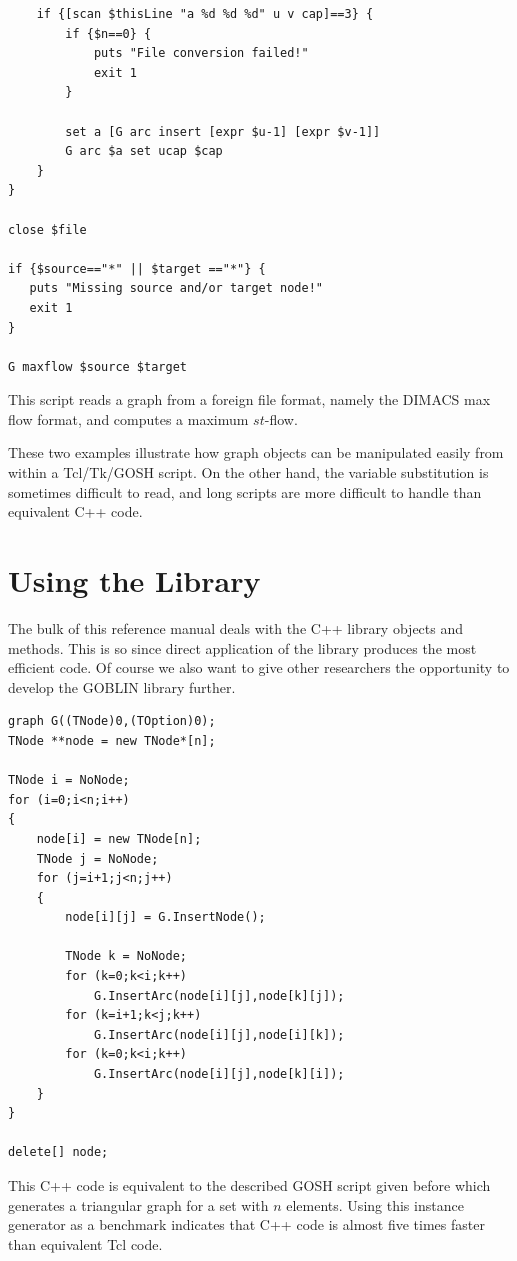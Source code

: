 \documentclass[a4paper,11pt,twoside]{book}
\begin{document}
\begin{multicols}{2}
\begin{mysample}
\begin{verbatim}
    if {[scan $thisLine "a %d %d %d" u v cap]==3} {
        if {$n==0} {
            puts "File conversion failed!"
            exit 1
        }

        set a [G arc insert [expr $u-1] [expr $v-1]]
        G arc $a set ucap $cap
    }
}

close $file

if {$source=="*" || $target =="*"} {
   puts "Missing source and/or target node!"
   exit 1
}

G maxflow $source $target
\end{verbatim}
\end{mysample}
This script reads a graph from a foreign file format, namely the DIMACS max
flow format, and computes a maximum $st$-flow.

These two examples illustrate how graph objects can be manipulated easily from
within a Tcl/Tk/GOSH script. On the other hand, the variable substitution is
sometimes difficult to read, and long scripts are more difficult to handle
than equivalent C++ code. 



\section{Using the Library}

The bulk of this reference manual deals with the C++ library objects and
methods. This is so since direct application of the library produces the most
efficient code. Of course we also want to give other researchers the
opportunity to develop the GOBLIN library further.
\begin{mysample}
\begin{verbatim}
graph G((TNode)0,(TOption)0);
TNode **node = new TNode*[n];

TNode i = NoNode;
for (i=0;i<n;i++)
{
    node[i] = new TNode[n];
    TNode j = NoNode;
    for (j=i+1;j<n;j++)
    {
        node[i][j] = G.InsertNode();

        TNode k = NoNode;
        for (k=0;k<i;k++)
            G.InsertArc(node[i][j],node[k][j]);
        for (k=i+1;k<j;k++)
            G.InsertArc(node[i][j],node[i][k]);
        for (k=0;k<i;k++)
            G.InsertArc(node[i][j],node[k][i]);
    }
}

delete[] node;
\end{verbatim}
\end{mysample}
This C++ code is equivalent to the described GOSH script given before which
generates a triangular graph for a set with $n$ elements. Using this instance
generator as a benchmark indicates that C++ code is almost five times faster
than equivalent Tcl code.




\end{multicols}
\end{document}

